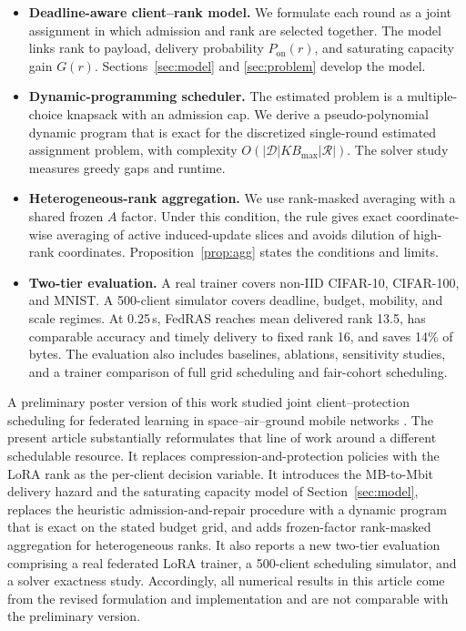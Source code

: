 \documentclass[preprint,12pt]{elsarticle}
\begin{document}
\begin{itemize}
\item \textbf{Deadline-aware client--rank model.} We formulate each round as a joint assignment in which admission and rank are selected together. The model links rank to payload, delivery probability $P_{\mathrm{on}}(r)$, and saturating capacity gain $G(r)$. Sections~\ref{sec:model} and \ref{sec:problem} develop the model.
\item \textbf{Dynamic-programming scheduler.} The estimated problem is a multiple-choice knapsack with an admission cap. We derive a pseudo-polynomial dynamic program that is exact for the discretized single-round estimated assignment problem, with complexity $O(|\mathcal D| K B_{\max}|\mathcal R|)$. The solver study measures greedy gaps and runtime.
\item \textbf{Heterogeneous-rank aggregation.} We use rank-masked averaging with a shared frozen $A$ factor. Under this condition, the rule gives exact coordinate-wise averaging of active induced-update slices and avoids dilution of high-rank coordinates. Proposition~\ref{prop:agg} states the conditions and limits.
\item \textbf{Two-tier evaluation.} A real trainer covers non-IID CIFAR-10, CIFAR-100, and MNIST. A 500-client simulator covers deadline, budget, mobility, and scale regimes. At 0.25\,s, FedRAS reaches mean delivered rank 13.5, has comparable accuracy and timely delivery to fixed rank 16, and saves 14\% of bytes. The evaluation also includes baselines, ablations, sensitivity studies, and a trainer comparison of full grid scheduling and fair-cohort scheduling.
\end{itemize}

A preliminary poster version of this work studied joint client--protection scheduling for federated learning in space--air--ground mobile networks \cite{ma2026mswim}. The present article substantially reformulates that line of work around a different schedulable resource. It replaces compression-and-protection policies with the LoRA rank as the per-client decision variable. It introduces the MB-to-Mbit delivery hazard and the saturating capacity model of Section~\ref{sec:model}, replaces the heuristic admission-and-repair procedure with a dynamic program that is exact on the stated budget grid, and adds frozen-factor rank-masked aggregation for heterogeneous ranks. It also reports a new two-tier evaluation comprising a real federated LoRA trainer, a 500-client scheduling simulator, and a solver exactness study. Accordingly, all numerical results in this article come from the revised formulation and implementation and are not comparable with the preliminary version.
\end{document}
